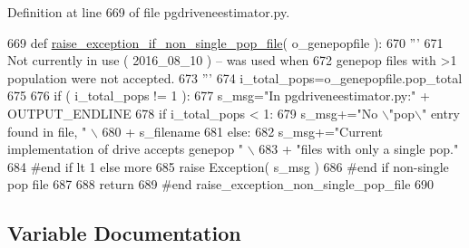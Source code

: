 Definition at line 669 of file pgdriveneestimator.\+py.


\begin{DoxyCode}
669 \textcolor{keyword}{def }\hyperlink{namespacenegui_1_1pgdriveneestimator_ac98833013f11d6aa3544b0fc60951632}{raise\_exception\_if\_non\_single\_pop\_file}( o\_genepopfile ):
670     \textcolor{stringliteral}{'''}
671 \textcolor{stringliteral}{    Not currently in use ( 2016\_08\_10 ) -- was used when}
672 \textcolor{stringliteral}{    genepop files with >1 population were not accepted.}
673 \textcolor{stringliteral}{    '''}
674     i\_total\_pops=o\_genepopfile.pop\_total
675 
676     \textcolor{keywordflow}{if} ( i\_total\_pops != 1 ):
677         s\_msg=\textcolor{stringliteral}{"In pgdriveneestimator.py:"} + OUTPUT\_ENDLINE
678         \textcolor{keywordflow}{if} i\_total\_pops < 1:
679             s\_msg+=\textcolor{stringliteral}{"No \(\backslash\)"pop\(\backslash\)" entry found in file, "} \(\backslash\)
680                     + s\_filename
681         \textcolor{keywordflow}{else}:
682             s\_msg+=\textcolor{stringliteral}{"Current implementation of drive accepts genepop "} \(\backslash\)
683                 + \textcolor{stringliteral}{"files with only a single pop."}
684         \textcolor{comment}{#end if lt 1 else more}
685         \textcolor{keywordflow}{raise} Exception( s\_msg )
686     \textcolor{comment}{#end if non-single pop file}
687 
688     \textcolor{keywordflow}{return}
689 \textcolor{comment}{#end raise\_exception\_non\_single\_pop\_file}
690 
\end{DoxyCode}


\subsection{Variable Documentation}
